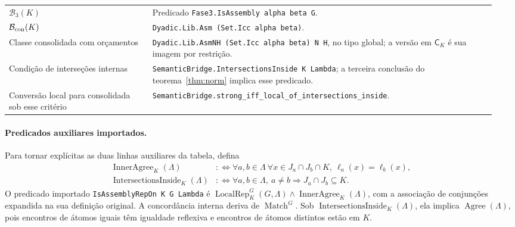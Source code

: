 \documentclass[11pt,a4paper]{article}
\newcommand{\CK}{\mathsf C_K}
\newcommand{\Match}{\operatorname{Match}}
\newcommand{\Agree}{\operatorname{Agree}}
\newcommand{\Loc}{\operatorname{LocalRep}}
\newcommand{\code}[1]{\nolinkurl{#1}}
\begin{document}
\begin{longtable}{@{}>{\raggedright\arraybackslash}p{0.28\linewidth}>{\raggedright\arraybackslash}p{0.67\linewidth}@{}}
$\mathcal B_3(K)$ & Predicado \code{Fase3.IsAssembly alpha beta G}.\\
$\mathcal B_{\rm con}(K)$ & \code{Dyadic.Lib.Asm (Set.Icc alpha beta)}.\\
Classe consolidada com orçamentos &
\code{Dyadic.Lib.AsmNH (Set.Icc alpha beta) N H}, no tipo global;
a versão em $\CK$ é sua imagem por restrição.\\
Condição de interseções internas &
\code{SemanticBridge.IntersectionsInside K Lambda}; a terceira conclusão
do teorema~\ref{thm:norm} implica esse predicado.\\
Conversão local para consolidada sob esse critério &
\code{SemanticBridge.strong_iff_local_of_intersections_inside}.\\
\bottomrule
\end{longtable}

\paragraph{Predicados auxiliares importados.}
Para tornar explícitas as duas linhas auxiliares da tabela, defina
\begin{align*}
 \operatorname{InnerAgree}_K(\Lambda)
 &:\Longleftrightarrow
 \forall a,b\in\Lambda\ \forall x\in J_a\cap J_b\cap K,\
                    \ell_a(x)=\ell_b(x),\\
 \operatorname{IntersectionsInside}_K(\Lambda)
 &:\Longleftrightarrow
 \forall a,b\in\Lambda,\ a\ne b\Rightarrow J_a\cap J_b\subseteq K.
\end{align*}
O predicado importado \code{IsAssemblyRepOn K G Lambda} é
$\Loc^G_K(G,\Lambda)\land\operatorname{InnerAgree}_K(\Lambda)$,
com a associação de conjunções expandida na sua definição original.
A concordância interna deriva de $\Match^G$. Sob
$\operatorname{IntersectionsInside}_K(\Lambda)$, ela implica
$\Agree(\Lambda)$, pois encontros de átomos iguais têm igualdade
reflexiva e encontros de átomos distintos estão em $K$.
\end{document}
